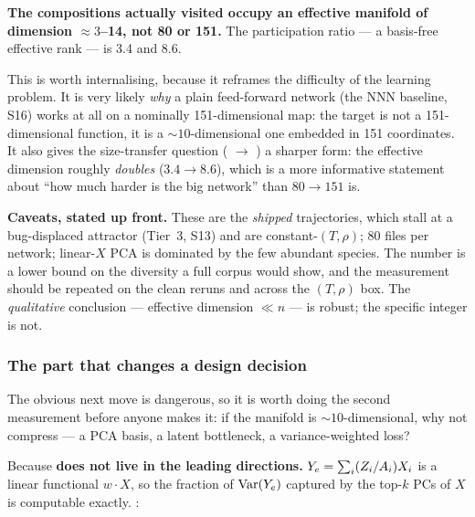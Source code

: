 \textbf{The compositions actually visited occupy an effective manifold of
dimension $\approx 3$--14, not 80 or 151.} The participation ratio --- a
basis-free effective rank --- is 3.4 and 8.6.

This is worth internalising, because it reframes the difficulty of the learning
problem. It is very likely \emph{why} a plain feed-forward network (the NNN
baseline, S16) works at all on a nominally 151-dimensional map: the target is
not a 151-dimensional function, it is a ${\sim}10$-dimensional one embedded in
151 coordinates. It also gives the size-transfer question ( $\to$
) a sharper form: the effective dimension roughly \emph{doubles}
($3.4 \to 8.6$), which is a more informative statement about ``how much harder
is the big network'' than $80 \to 151$ is.

\begin{warn}
\textbf{Caveats, stated up front.} These are the \emph{shipped} trajectories,
which stall at a bug-displaced attractor (Tier~3, S13) and are
constant-$(T, \rho)$; 80 files per network; linear-$X$ PCA is dominated by the
few abundant species. The number is a lower bound on the diversity a full corpus
would show, and the measurement should be repeated on the clean reruns and
across the $(T, \rho)$ box. The \emph{qualitative} conclusion --- effective
dimension $\ll n$ --- is robust; the specific integer is not.
\end{warn}

\subsubsection{The part that changes a design decision}
\label{sec:effdim-design}

The obvious next move is dangerous, so it is worth doing the second measurement
before anyone makes it: if the manifold is ${\sim}10$-dimensional, why not
compress --- a PCA basis, a latent bottleneck, a variance-weighted loss?

Because \textbf{\Ye{} does not live in the leading directions.}
$Y_{e} = \sum_i (Z_i/A_i)X_i$ is a linear functional $w\cdot X$, so the fraction
of $\operatorname*{Var}(Y_{e})$ captured by the top-$k$ PCs of $X$ is computable exactly.
\derivedhere:

